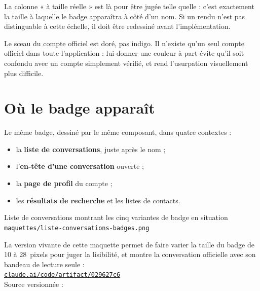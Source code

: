 \medskip

La colonne « à taille réelle » est là pour être jugée telle quelle : c'est exactement la
taille à laquelle le badge apparaîtra à côté d'un nom. Si un rendu n'est pas
distinguable à cette échelle, il doit être redessiné avant l'implémentation.

\begin{note}
Le sceau du compte officiel est doré, pas indigo. Il n'existe qu'un seul compte
officiel dans toute l'application : lui donner une couleur à part évite qu'il soit confondu
avec un compte simplement vérifié, et rend l'usurpation visuellement plus difficile.
\end{note}

\section{Où le badge apparaît}

Le même badge, dessiné par le même composant, dans quatre contextes :

\begin{itemize}[leftmargin=1.4em]
  \item la \textbf{liste de conversations}, juste après le nom ;
  \item l'\textbf{en-tête d'une conversation} ouverte ;
  \item la \textbf{page de profil} du compte ;
  \item les \textbf{résultats de recherche} et les listes de contacts.
\end{itemize}

\begin{center}
    {Liste de conversations montrant les cinq variantes de badge en situation\\
     \texttt{maquettes/liste-conversations-badges.png}}
\end{center}

\begin{note}
La version vivante de cette maquette permet de faire varier la taille du badge de 10 à
28~pixels pour juger la lisibilité, et montre la conversation officielle avec son bandeau
de lecture seule :\\
\href{https://claude.ai/code/artifact/029627c6-5dae-4b2a-a86b-3e28c899d824}%
{\texttt{claude.ai/code/artifact/029627c6}}\\
Source versionnée : 
\end{note}

